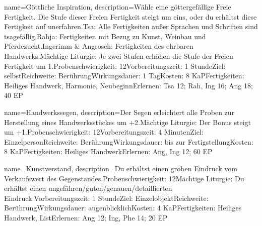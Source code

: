 {
    name={Göttliche Inspiration},
    description={Wähle eine göttergefällige Freie Fertigkeit. Die Stufe dieser Freien Fertigkeit steigt um eins, oder du erhältst diese Fertigkeit auf unerfahren.\newline Tsa: Alle Fertigkeiten außer Sprachen und Schriften sind tsagefällig.\newline Rahja: Fertigkeiten mit Bezug zu Kunst, Weinbau und Pferdezucht.\newline Ingerimm \& Angrosch: Fertigkeiten des ehrbaren Handwerks.\newline Mächtige Liturgie: Je zwei Stufen erhöhen die Stufe der Freien Fertigkeit um 1.\newline Probenschwierigkeit: 12\newline Vorbereitungszeit: 1 Stunde\newline Ziel: selbst\newline Reichweite: Berührung\newline Wirkungsdauer: 1 Tag\newline Kosten: 8 KaP\newline Fertigkeiten: Heiliges Handwerk, Harmonie, Neubeginn\newline Erlernen: Tsa 12; Rah, Ing 16; Ang 18; 40 EP}
}


{
    name={Handwerkssegen},
    description={Der Segen erleichtert alle Proben zur Herstellung eines Handwerksstückes um +2.\newline Mächtige Liturgie: Der Bonus steigt um +1.\newline Probenschwierigkeit: 12\newline Vorbereitungszeit: 4 Minuten\newline Ziel: Einzelperson\newline Reichweite: Berührung\newline Wirkungsdauer: bis zur Fertigstellung\newline Kosten: 8 KaP\newline Fertigkeiten: Heiliges Handwerk\newline Erlernen: Ang, Ing 12; 60 EP}
}


{
    name={Kunstverstand},
    description={Du erhältst einen groben Eindruck vom Verkaufswert des Gegenstandes.\newline Probenschwierigkeit: 12\newline Mächtige Liturgie: Du erhältst einen ungefähren/guten/genauen/detaillierten Eindruck.\newline Vorbereitungszeit: 1 Stunde\newline Ziel: Einzelobjekt\newline Reichweite: Berührung\newline Wirkungsdauer: augenblicklich\newline Kosten: 4 KaP\newline Fertigkeiten: Heiliges Handwerk, List\newline Erlernen: Ang 12; Ing, Phe 14; 20 EP}
}



